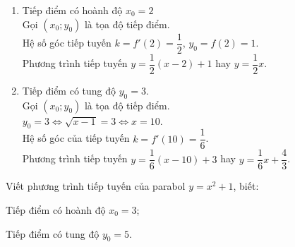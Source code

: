 \begin{bt}
\begin{bt}
{	\begin{enumerate}
	\item Tiếp điểm có hoành độ $x_0=2$\\
	Gọi $(x_0;y_0)$ là tọa độ tiếp điểm.\\
	Hệ số góc tiếp tuyến $k=f'(2)=\dfrac{1}{2}$, 
	$y_0=f(2)=1$.\\
	Phương trình tiếp tuyến $y=\dfrac{1}{2}(x-2)+1$ hay $y=\dfrac{1}{2}x$.
	\item Tiếp điểm có tung độ $y_0=3$.\\
	Gọi $(x_0;y_0)$ là tọa độ tiếp điểm.\\
	$y_0=3\Leftrightarrow \sqrt{x-1}=3\Leftrightarrow x=10$.\\
	Hệ số góc của tiếp tuyến $k=f'(10)=\dfrac{1}{6}$.\\
	Phương trình tiếp tuyến $y=\dfrac{1}{6}(x-10)+3$ hay $y=\dfrac{1}{6}x+\dfrac{4}{3}$.
	\end{enumerate}	
	}
\end{bt}
\begin{bt}%
	Viết phương trình tiếp tuyến của parabol $y=x^2+1$, biết:
	\begin{listEX}[2]
	\item Tiếp điểm có hoành độ $x_0=3$;
	\item Tiếp điểm có tung độ $y_0=5$.
	\end{listEX}	
\end{bt}

\end{bt}

